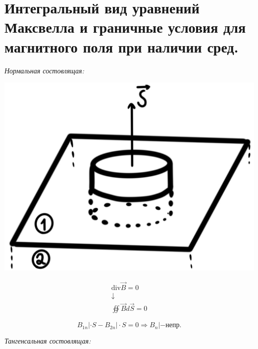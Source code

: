 \section{Интегральный вид уравнений Максвелла и граничные условия для
магнитного поля при наличии сред.}

\textit{Нормальная состовлящая:}

\begin{minipage}[c]{0.4\textwidth} %
    \includegraphics[width=\textwidth]{im/73.png} %
\end{minipage}%
\hfill
\begin{minipage}[c]{0.7\textwidth} %
    \begin{gather*}
        \mathrm{div}\vec{B}=0 \\
        \downarrow \\
        \oiint \vec{B}d\vec{S}=0 
    \end{gather*}
\end{minipage}

\[
B_{1n}|\cdot S-B_{2n}|\cdot S=0 \Rightarrow \boxed{B_n|-\text{непр.}}
\]

\textit{Тангенсальная состовлящая:}

